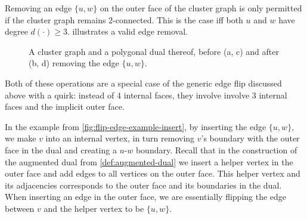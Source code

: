Removing an edge $\{u,w\}$ on the outer face of the cluster graph is only permitted if the cluster graph remains $2$-connected. This is the case iff both $u$ and $w$ have degree $d(\cdot) \geq 3$.  illustrates a valid edge removal.

\begin{figure}[H]
	\centering
	\quad
	\qquad
	\quad
	\caption{A cluster graph and a polygonal dual thereof, before (a, c) and after (b, d) removing the edge $\{u,w\}$.}
	\label{fig:flip-edge-example-remove}
\end{figure}

Both of these operations are a special case of the generic edge flip discussed above with a quirk: instead of 4 internal faces, they involve involve 3 internal faces and the implicit outer face.

In the example from \cref{fig:flip-edge-example-insert}, by inserting the edge $\{u,w\}$, we make $v$ into an internal vertex, in turn removing $v$'s boundary with the outer face in the dual and creating a $u$-$w$ boundary. Recall that in the construction of the augmented dual from \cref{def:augmented-dual} we insert a helper vertex in the outer face and add edges to all vertices on the outer face. This helper vertex and its adjacencies corresponds to the outer face and its boundaries in the dual. When inserting an edge in the outer face, we are essentially flipping the edge between $v$ and the helper vertex to be $\{u,w\}$.

